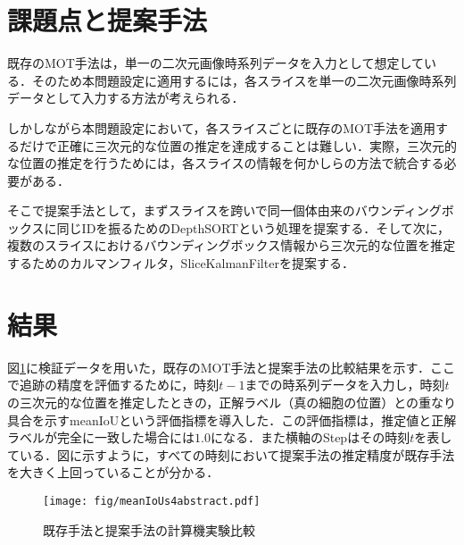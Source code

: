 \section{課題点と提案手法}

既存のMOT手法は，単一の二次元画像時系列データを入力として想定している．そのため本問題設定に適用するには，各スライスを単一の二次元画像時系列データとして入力する方法が考えられる．

しかしながら本問題設定において，各スライスごとに既存のMOT手法を適用するだけで正確に三次元的な位置の推定を達成することは難しい．実際，三次元的な位置の推定を行うためには，各スライスの情報を何かしらの方法で統合する必要がある．

そこで提案手法として，まずスライスを跨いで同一個体由来のバウンディングボックスに同じIDを振るためのDepthSORTという処理を提案する．そして次に，複数のスライスにおけるバウンディングボックス情報から三次元的な位置を推定するためのカルマンフィルタ，SliceKalmanFilterを提案する．

\section{結果}

図\ref{fig:meanIoUs}に検証データを用いた，既存のMOT手法と提案手法の比較結果を示す．ここで追跡の精度を評価するために，時刻$t-1$までの時系列データを入力し，時刻$t$の三次元的な位置を推定したときの，正解ラベル（真の細胞の位置）との重なり具合を示すmeanIoUという評価指標を導入した．この評価指標は，推定値と正解ラベルが完全に一致した場合には$1.0$になる．また横軸のStepはその時刻$t$を表している．図に示すように，すべての時刻において提案手法の推定精度が既存手法を大きく上回っていることが分かる．

\begin{figure}[h]
    \centering
    \texttt{[image: fig/meanIoUs4abstract.pdf]}
    \caption{既存手法と提案手法の計算機実験比較}
    \label{fig:meanIoUs}
\end{figure}
